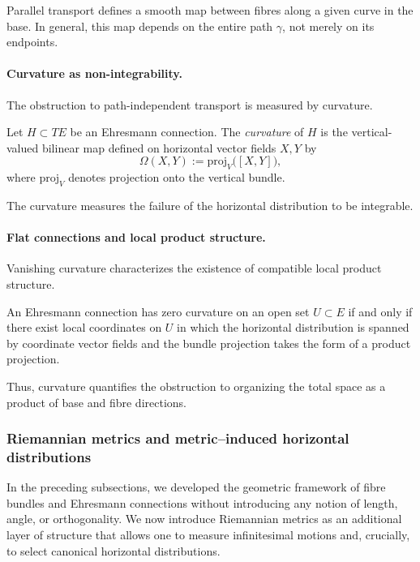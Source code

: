 Parallel transport defines a smooth map between fibres along a given curve in the base.
In general, this map depends on the entire path $\gamma$, not merely on its endpoints.


\paragraph{Curvature as non-integrability.}
The obstruction to path-independent transport is measured by curvature.

\begin{gdefn}
Let $H\subset TE$ be an Ehresmann connection.
The \emph{curvature} of $H$ is the vertical-valued bilinear map defined on horizontal
vector fields $X,Y$ by
\[
\Omega(X,Y)
:=
\mathrm{proj}_V\bigl([X,Y]\bigr),
\]
where $\mathrm{proj}_V$ denotes projection onto the vertical bundle.
\end{gdefn}

The curvature measures the failure of the horizontal distribution to be integrable.

\paragraph{Flat connections and local product structure.}
Vanishing curvature characterizes the existence of compatible local product structure.

\begin{gprop}
An Ehresmann connection has zero curvature on an open set $U\subset E$ if and only if
there exist local coordinates on $U$ in which the horizontal distribution is spanned by
coordinate vector fields and the bundle projection takes the form of a product
projection.
\end{gprop}

Thus, curvature quantifies the obstruction to organizing the total space as a product of
base and fibre directions.

\subsubsection{Riemannian metrics and metric--induced horizontal distributions}
\label{subsec:background_metrics}

In the preceding subsections, we developed the geometric framework of fibre bundles and
Ehresmann connections without introducing any notion of length, angle, or orthogonality.
We now introduce Riemannian metrics as an additional layer of structure that allows one
to measure infinitesimal motions and, crucially, to select canonical horizontal
distributions.

